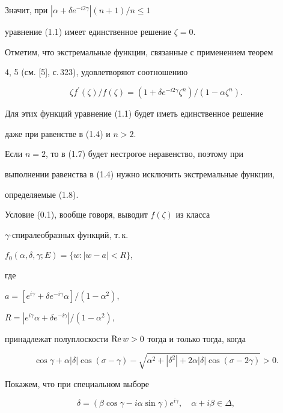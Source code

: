 Значит, при $|\alpha+\delta e^{-i2\gamma}|(n+1)/n\le 1$ 


уравнение (1.1) имеет единственное решение $\zeta=0$.





Отметим, что экстремальные функции, связанные с применением теорем


4, 5 (см. [5], с.\,323), удовлетворяют соотношению


\begin{equation}


\zeta f^{\prime}(\zeta)/f(\zeta)=


(1+\delta e^{-i2\gamma}\zeta^n)/(1-\alpha \zeta^n). 


\end{equation}


Для этих функций уравнение (1.1) будет иметь единственное решение


даже при равенстве в (1.4) и $n>2$.


Если $n=2$, то в (1.7) будет нестрогое неравенство, поэтому при


выполнении равенства в (1.4) нужно исключить экстремальные функции,


определяемые (1.8).





Условие (0.1), вообще говоря, выводит $f(\zeta)$ из класса


$\gamma$-спиралеобразных функций, т.\,к.


$f_0(\alpha,\delta,\gamma;E)=\{ w: |w-a|<R\}$,


где


$a=[e^{i\gamma}+\delta e^{-i\gamma}\alpha]/(1-\alpha^2)$,


$R=|e^{i\gamma}\alpha+\delta e^{-i\gamma}|/(1-\alpha^2)$,


принадлежат полуплоскости $\operatorname{Re} w>0$ тогда и только тогда, когда


\begin{equation}


\cos\gamma+\alpha|\delta|\cos(\sigma-\gamma)-\sqrt


{\alpha^2+|\delta^2|+2\alpha|\delta|\cos(\sigma-2\gamma)}>0.


\end{equation}


Покажем, что при специальном выборе


\begin{equation}


\delta=(\beta\cos\gamma-i\alpha\sin\gamma)e^{i\gamma}, \quad \alpha+


i\beta\in\Delta,


\end{equation}


